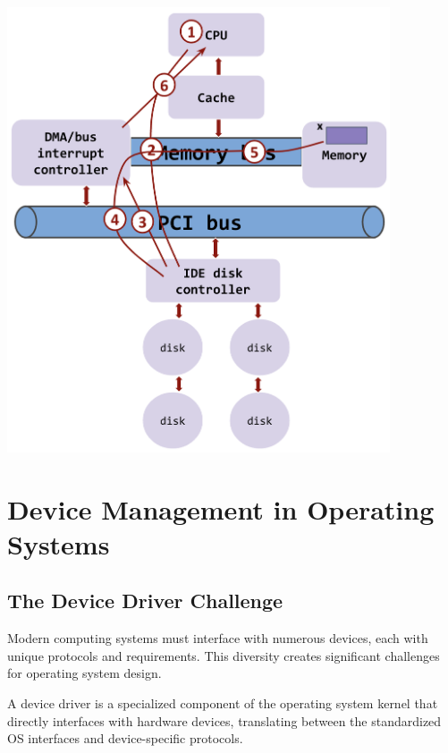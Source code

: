 \documentclass[../../compsys.tex]{subfiles}
\begin{document}
\begin{minipage}{0.45\textwidth}
\begin{center}
    \includegraphics[width=0.85\textwidth]{chapters/L8/images/dma.png}
\end{center}
\end{minipage}

\section{Device Management in Operating Systems}

\subsection{The Device Driver Challenge}

Modern computing systems must interface with numerous devices, each with unique protocols and requirements. This diversity creates significant challenges for operating system design.

\begin{definition}
A device driver is a specialized component of the operating system kernel that directly interfaces with hardware devices, translating between the standardized OS interfaces and device-specific protocols.
\end{definition}
\end{document}

